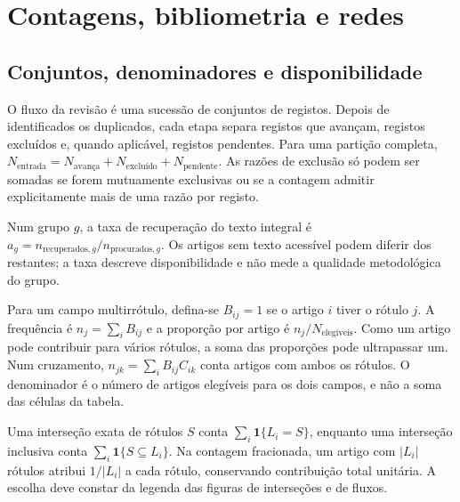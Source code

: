 
\section{Contagens, bibliometria e redes}
\label{sec:mat-bibliometria}

\subsection{Conjuntos, denominadores e disponibilidade}
\label{sec:mat-contagens}
O fluxo da revisão é uma sucessão de conjuntos de registos. Depois de identificados os duplicados, cada etapa separa registos que avançam, registos excluídos e, quando aplicável, registos pendentes. Para uma partição completa, $N_{\mathrm{entrada}}=N_{\mathrm{avança}}+N_{\mathrm{excluído}}+N_{\mathrm{pendente}}$. As razões de exclusão só podem ser somadas se forem mutuamente exclusivas ou se a contagem admitir explicitamente mais de uma razão por registo.

Num grupo $g$, a taxa de recuperação do texto integral é $a_g=n_{\mathrm{recuperados},g}/n_{\mathrm{procurados},g}$. Os artigos sem texto acessível podem diferir dos restantes; a taxa descreve disponibilidade e não mede a qualidade metodológica do grupo.

Para um campo multirrótulo, defina-se $B_{ij}=1$ se o artigo $i$ tiver o rótulo $j$. A frequência é $n_j=\sum_iB_{ij}$ e a proporção por artigo é $n_j/N_{\mathrm{elegíveis}}$. Como um artigo pode contribuir para vários rótulos, a soma das proporções pode ultrapassar um. Num cruzamento, $n_{jk}=\sum_iB_{ij}C_{ik}$ conta artigos com ambos os rótulos. O denominador é o número de artigos elegíveis para os dois campos, e não a soma das células da tabela.

Uma interseção exata de rótulos $S$ conta $\sum_i\mathbf1\{L_i=S\}$, enquanto uma interseção inclusiva conta $\sum_i\mathbf1\{S\subseteq L_i\}$. Na contagem fracionada, um artigo com $|L_i|$ rótulos atribui $1/|L_i|$ a cada rótulo, conservando contribuição total unitária. A escolha deve constar da legenda das figuras de interseções e de fluxos.

